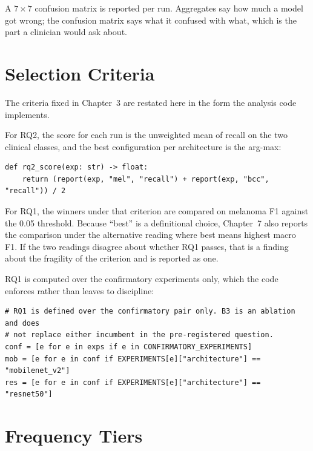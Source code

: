 A $7 \times 7$ confusion matrix is reported per run. Aggregates say how much a model got
wrong; the confusion matrix says what it confused with what, which is the part a
clinician would ask about.

\section{Selection Criteria}
\label{sec:eval-criteria}

The criteria fixed in Chapter~3 are restated here in the form the analysis code
implements.

For RQ2, the score for each run is the unweighted mean of recall on the two clinical
classes, and the best configuration per architecture is the arg-max:

\begin{lstlisting}[caption={The RQ2 criterion, \texttt{scripts/build\_tables.py}.},
                   label={lst:rq2}]
def rq2_score(exp: str) -> float:
    return (report(exp, "mel", "recall") + report(exp, "bcc", "recall")) / 2
\end{lstlisting}

For RQ1, the winners under that criterion are compared on melanoma F1 against the 0.05
threshold. Because ``best'' is a definitional choice, Chapter~7 also reports the
comparison under the alternative reading where best means highest macro F1. If the two
readings disagree about whether RQ1 passes, that is a finding about the fragility of the
criterion and is reported as one.

RQ1 is computed over the confirmatory experiments only, which the code enforces rather
than leaves to discipline:

\begin{lstlisting}[caption={RQ1 restricted to the confirmatory factorial,
\texttt{scripts/build\_tables.py}.}, label={lst:rq1-scope}]
# RQ1 is defined over the confirmatory pair only. B3 is an ablation and does
# not replace either incumbent in the pre-registered question.
conf = [e for e in exps if e in CONFIRMATORY_EXPERIMENTS]
mob = [e for e in conf if EXPERIMENTS[e]["architecture"] == "mobilenet_v2"]
res = [e for e in conf if EXPERIMENTS[e]["architecture"] == "resnet50"]
\end{lstlisting}

\section{Frequency Tiers}
\label{sec:eval-tiers}


